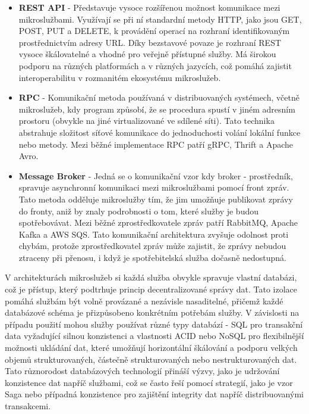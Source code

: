 \begin{itemize}
    \item \textbf{REST API} - Představuje vysoce rozšířenou možnost komunikace mezi mikroslužbami. Využívají se při ní standardní metody HTTP, jako jsou GET, POST, PUT a DELETE, k provádění operací na rozhraní identifikovaným prostřednictvím adresy URL. Díky bezstavové povaze je rozhraní REST vysoce škálovatelné a vhodné pro veřejně přístupné služby. Má širokou podporu na různých platformách a v různých jazycích, což pomáhá zajistit interoperabilitu v rozmanitém ekosystému mikroslužeb.
    \item \textbf{RPC} - Komunikační metoda používaná v distribuovaných systémech, včetně mikroslužeb, kdy program způsobí, že se procedura spustí v jiném adresním prostoru (obvykle na jiné virtualizované ve sdílené síti). Tato technika abstrahuje složitost síťové komunikace do jednoduchosti volání lokální funkce nebo metody. Mezi běžné implementace RPC patří gRPC, Thrift a Apache Avro.
    \item \textbf{Message Broker} - Jedná se o komunikační vzor kdy broker - prostředník, spravuje asynchronní komunikaci mezi mikroslužbami pomocí front zpráv. Tato metoda odděluje mikroslužby tím, že jim umožňuje publikovat zprávy do fronty, aniž by znaly podrobnosti o tom, které služby je budou spotřebovávat. Mezi běžné zprostředkovatele zpráv patří RabbitMQ, Apache Kafka a AWS SQS. Tato komunikační architektura zvyšuje odolnost proti chybám, protože zprostředkovatel zpráv může zajistit, že zprávy nebudou ztraceny při přenosu, i když je spotřebitelská služba dočasně nedostupná. 
\end{itemize}


V architekturách mikroslužeb si každá služba obvykle spravuje vlastní databázi, což je přístup, který podtrhuje princip decentralizované správy dat. Tato izolace pomáhá službám být volně provázané a nezávisle nasaditelné, přičemž každé databázové schéma je přizpůsobeno konkrétním potřebám služby. V závislosti na případu použití mohou služby používat různé typy databází - SQL pro transakční data vyžadující silnou konzistenci a vlastnosti ACID nebo NoSQL pro flexibilnější možnosti ukládání dat, které umožňují horizontální škálování a podporu velkých objemů strukturovaných, částečně strukturovaných nebo nestrukturovaných dat. Tato různorodost databázových technologií přináší výzvy, jako je udržování konzistence dat napříč službami, což se často řeší pomocí strategií, jako je vzor Saga nebo případná konzistence pro zajištění integrity dat napříč distribuovanými transakcemi.

